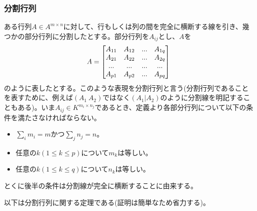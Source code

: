 \documentclass[dvipdfmx, 9pt, a4paper]{jsarticle}
\numberwithin{equation}{subsection}
\begin{document}
\subsubsection{分割行列}
ある行列$A \in A^{m \times n}$に対して、行もしくは列の間を完全に横断する線を引き、幾つかの部分行列に分割したとする。部分行列を$A_{ij}$とし、$A$を
\begin{equation}
A=
\begin{bmatrix}
A_{11} & A_{12} & ... & A_{1q} \\
A_{21} & A_{22} & ... & A_{2q} \\
... & ... & ... & ... \\
A_{p1} & A_{p2} & ... & A_{pq} \\
\end{bmatrix} \notag
\end{equation}
のように表したとする。このような表現を分割行列と言う(分割行列であることを表すために、例えば$(A_1~A_2)$ではなく$(A_1|A_2)$のように分割線を明記することもある)。いま$A_{ij} \in K^{m_i \times n_j}$であるとき、定義より各部分行列について以下の条件を満たさなければならない。
\begin{itemize}
\item $\sum_i m_i = m$かつ$\sum_j n_j = n$。
\item 任意の$k(1\leq k \leq p)$について$m_k$は等しい。
\item 任意の$k(1\leq k \leq q)$について$n_k$は等しい。
\end{itemize}
とくに後半の条件は分割線が完全に横断することに由来する。\par
以下は分割行列に関する定理である(証明は簡単なため省力する)。
\end{document}
